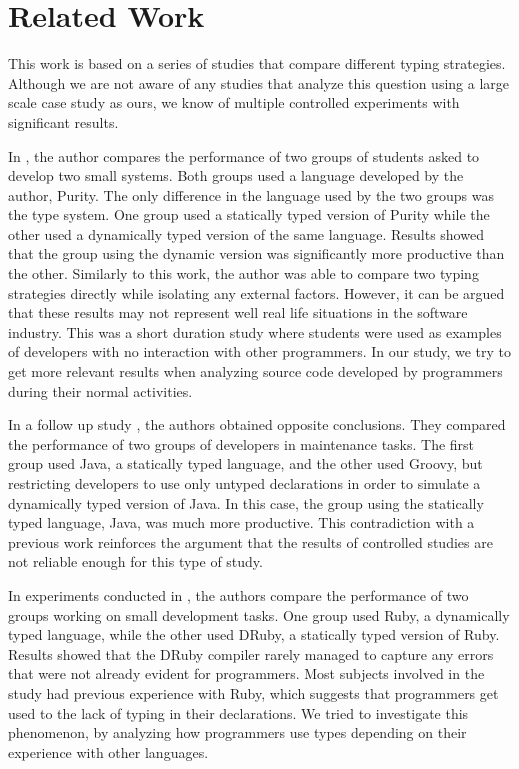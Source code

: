 \documentclass[preprint]{sigplanconf}
\begin{document}
\section{Related Work\label{related}}
This work is based on a series of studies that compare different typing strategies.
Although we are not aware of any studies that analyze this question using a large scale case study as ours, we know of multiple controlled experiments with significant results.

In \cite{experiment_with_purity}, the author compares the performance of two groups of students asked to develop two small systems. 
Both groups used a language developed by the author, Purity. 
The only difference in the language used by the two groups was the type system.
One group used a statically typed version of Purity while the other used a dynamically typed version of the same language.
Results showed that the group using the dynamic version was significantly more productive than the other. 
Similarly to this work, the author was able to compare two typing strategies directly while isolating any external factors. 
However, it can be argued that these results may not represent well real life situations in the software industry. 
This was a short duration study where students were used as examples of developers with no interaction with other programmers. 
In our study, we try to get more relevant results when analyzing source code developed by programmers during their normal activities.

In a follow up study \cite{hanenberg_icpc}, the authors obtained opposite conclusions. 
They compared the performance of two groups of developers in maintenance tasks. 
The first group used Java, a statically typed language, and the other used Groovy, but restricting developers to use only untyped declarations in order to simulate a dynamically typed version of Java.
In this case, the group using the statically typed language, Java, was much more productive.
This contradiction with a previous work reinforces the argument that the results of controlled studies are not reliable enough for this type of study.

In experiments conducted in \cite{ruby_vs_druby}, the authors compare the performance of two groups working on small development tasks.
One group used Ruby, a dynamically typed language, while the other used DRuby, a statically typed version of Ruby. 
Results showed that the DRuby compiler rarely managed to capture any errors that were not already evident for programmers.
Most subjects involved in the study had previous experience with Ruby, which suggests that programmers get used to the lack of typing in their declarations.
We tried to investigate this phenomenon, by analyzing how programmers use types depending on their experience with other languages.
\end{document}
